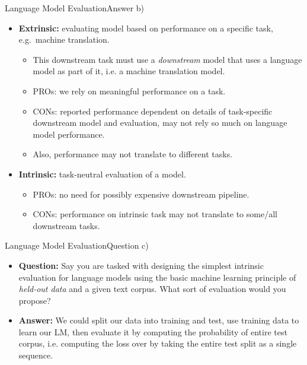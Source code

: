 \documentclass[t]{beamer}
\begin{document}
\begin{frame}{Language Model Evaluation}{Answer b)}
    \begin{itemize}
        \item \textbf{Extrinsic:} evaluating model based on performance on a
              specific task, e.g.\ machine translation.
              \begin{itemize}
                  \item This downstream task must use a \emph{downstream} model
                        that uses a language model as part of it, i.e. a machine
                        translation model.
                  \item PROs: we rely on meaningful performance on a task.
                  \item CONs: reported performance dependent on details of
                        task-specific downstream model and evaluation, may not
                        rely so much on language  model performance.
                  \item Also, performance may not translate to different tasks.
              \end{itemize}
        \item \textbf{Intrinsic:} task-neutral evaluation of a model.
              \begin{itemize}
                  \item PROs: no need for possibly expensive downstream
                        pipeline.
                  \item CONs: performance on intrinsic task may not translate to
                        some/all downstream tasks.
              \end{itemize}
    \end{itemize}
\end{frame}

\begin{frame}{Language Model Evaluation}{Question c)}
    \begin{itemize}
        \item \textbf{Question:} Say you are tasked with designing the simplest
              intrinsic evaluation for language models using the basic machine
              learning principle of \emph{held-out data} and a given text
              corpus.
              What sort of evaluation would you propose?
              \pause
        \item \textbf{Answer:} We could split our data into training and test,
              use training data to learn our LM, then evaluate it by computing
              the probability of entire test corpus, i.e. computing the loss
              over by taking the entire test split as a single sequence.
    \end{itemize}
\end{frame}
\end{document}
